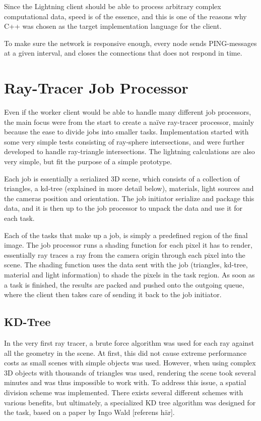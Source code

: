 Since the Lightning client should be able to process arbitrary complex computational data, speed is of the essence, and this is one of the reasons why C++ was chosen as the target implementation language for the client.

To make sure the network is responsive enough, every node sends PING-messages at a given interval, and closes the connections that does not respond in time.

\section{Ray-Tracer Job Processor}
Even if the worker client would be able to handle many different job processors, the main focus were from the start to create a naïve ray-tracer processor, mainly because the ease to divide jobs into smaller tasks. Implementation started with some very simple tests consisting of ray-sphere intersections, and were further developed to handle ray-triangle intersections. The lightning calculations are also very simple, but fit the purpose of a simple prototype.

Each job is essentially a serialized 3D scene, which consists of a collection of triangles, a kd-tree (explained in more detail below), materials, light sources and the cameras position and orientation. The job initiator serialize and package this data, and it is then up to the job processor to unpack the data and use it for each task.

Each of the tasks that make up a job, is simply a predefined region of the final image. The job processor runs a shading function for each pixel it has to render, essentially ray traces a ray from the camera origin through each pixel into the scene. The shading function uses the data sent with the job (triangles, kd-tree, material and light information) to shade the pixels in the task region. As soon as a task is finished, the results are packed and pushed onto the outgoing queue, where the client then takes care of sending it back to the job initiator.

\subsection{KD-Tree}
In the very first ray tracer, a brute force algorithm was used for each ray against all the geometry in the scene. At first, this did not cause extreme performance costs as small scenes with simple objects was used. However, when using complex 3D objects with thousands of triangles was used, rendering the scene took several minutes and was thus impossible to work with. To address this issue, a spatial division scheme was implemented. There exists several different schemes with various benefits, but ultimately, a specialized KD tree algorithm was designed for the task, based on a paper by Ingo Wald [referens här]. 

